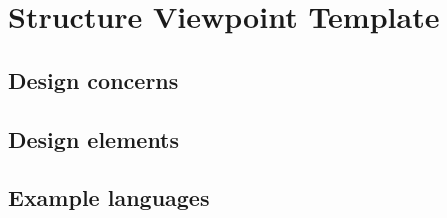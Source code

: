 \chapter{Structure Viewpoint Template} \label{chp:structure-viewpoint-template}
	\begin{comment}
		The Structure viewpoint is used to document the internal constituents and organization of the design subject
		in terms of like elements (recursively).
	\end{comment}
	
	\section{Design concerns} \label{s:structure-viewpoint-template:design-concerns}
		\begin{comment}
			Compositional structure of coarse-grained components and reuse of fine-grained components.
		\end{comment}
	
	\section{Design elements} \label{s:structure-viewpoint-template:design-elements}
		\begin{comment}
			Design entities: port, connector, interface, part, and class.
			
			Design relationships: connected, part of, enclosed, provided, and required.
			
			Design attributes: name, type, purpose, and definition.
			
			Design constraints: interface constraints, reusability constraints, and dependency constraints.
		\end{comment}
	
	\section{Example languages} \label{s:structure-viewpoint-template:example-languages}
		\begin{comment}
			UML composite structure diagram, UML class diagram, and UML package diagram (OMG [B28]).
		\end{comment}